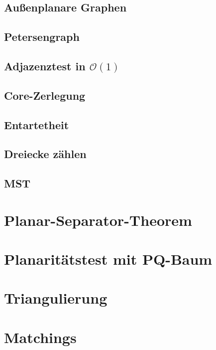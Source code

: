 \documentclass[10pt,a4paper]{article}
\begin{document}
\subsection{Außenplanare Graphen}
\subsection{Petersengraph}
\subsection{Adjazenztest in $\mathcal{O}(1)$}
\subsection{Core-Zerlegung}
\subsection{Entartetheit}
\subsection{Dreiecke zählen}
\subsection{MST}


\section{Planar-Separator-Theorem}


\section{Planaritätstest mit PQ-Baum}


\section{Triangulierung}


\section{Matchings}
\end{document}
